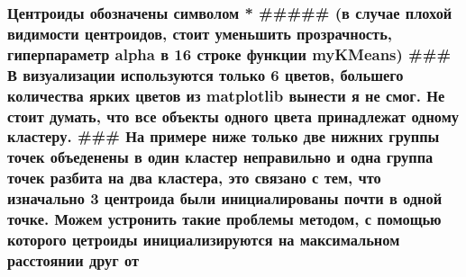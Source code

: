 \documentclass[11pt]{article}
\begin{document}
{\subsubsection{Центроиды обозначены символом * \#\#\#\#\# (в случае
плохой видимости центроидов, стоит уменьшить прозрачность, гиперпараметр
alpha в 16 строке функции myKMeans) \#\#\# В визуализации используются
только 6 цветов, большего количества ярких цветов из matplotlib вынести
я не смог. Не стоит думать, что все объекты одного цвета принадлежат
одному кластеру. \#\#\# На примере ниже только две нижних группы точек
объеденены в один кластер неправильно и одна группа точек разбита на два
кластера, это связано с тем, что изначально 3 центроида были
инициалированы почти в одной точке. Можем устронить такие проблемы
методом, с помощью которого цетроиды инициализируются на максимальном
расстоянии друг от
}}
\end{document}

